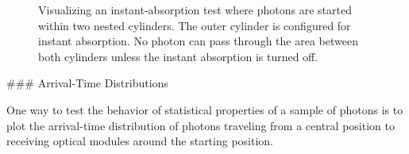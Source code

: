\begin{figure}[htbp]
  \hfill
  \hfill
  \caption{Visualizing an instant-absorption test where photons are started within two nested cylinders. The outer cylinder is configured for instant absorption. No photon can pass through the area between both cylinders unless the instant absorption is turned off.}
  \label{fig:sahmoo8O}
\end{figure}


### Arrival-Time Distributions
\label{sec:arrival_time}


One way to test the behavior of statistical properties of a sample of photons is to plot the arrival-time distribution of photons traveling from a central position to receiving optical modules around the starting position.


